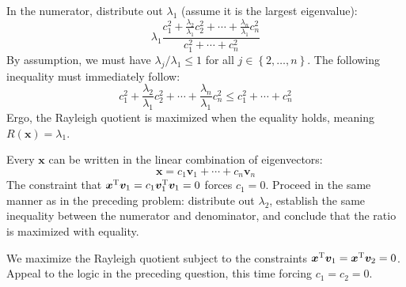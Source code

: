 \documentclass[a4paper]{article}
\begin{document}
In the numerator, distribute out \(\lambda_{1}\) (assume it is the largest eigenvalue):
\[
	\lambda_{1} \frac{c_{1}^{2} + \frac{\lambda_{2}}{\lambda_{1}}c_{2}^{2} + \cdots + \frac{\lambda_{n}}{\lambda_{1}}c_{n}^{2}}{c_{1}^{2} + \cdots + c_{n}^{2}}
\]
By assumption, we must have \(\lambda_{j} / \lambda_{1} \le 1\) for all \(j \in \!\left\{ 2, \ldots, n \right\} \). The following inequality must immediately follow:
\[
	c_{1}^{2} + \frac{\lambda_{2}}{\lambda_{1}}c_{2}^{2} + \cdots + \frac{\lambda_{n}}{\lambda_{1}}c_{n}^{2} \le c_{1}^{2} + \cdots + c_{n}^{2}
\]
Ergo, the Rayleigh quotient is maximized when the equality holds, meaning \(R \!\left( \bm{x} \right) = \lambda_{1}\).

\vspace{12pt}


Every \(\bm{x}\) can be written in the linear combination of eigenvectors:
\[
	\bm{x} = c_{1} \bm{v}_{1} + \cdots + c_{n} \bm{v}_{n}
\]
The constraint that \(\bm{x}^{\textsc{T}}\bm{v}_{1} = c_{1} \bm{v}_{1}^{\textsc{T}}\bm{v}_{1} = 0\) forces \(c_{1} = 0\). Proceed in the same manner as in the preceding problem: distribute out \(\lambda_{2}\), establish the same inequality between the numerator and denominator, and conclude that the ratio is maximized with equality.

\vspace{12pt}


We maximize the Rayleigh quotient subject to the constraints \(\bm{x}^{\textsc{T}}\bm{v}_{1} = \bm{x}^{\textsc{T}}\bm{v}_{2} = 0\). Appeal to the logic in the preceding question, this time forcing \(c_{1} = c_{2} = 0\).
\end{document}
